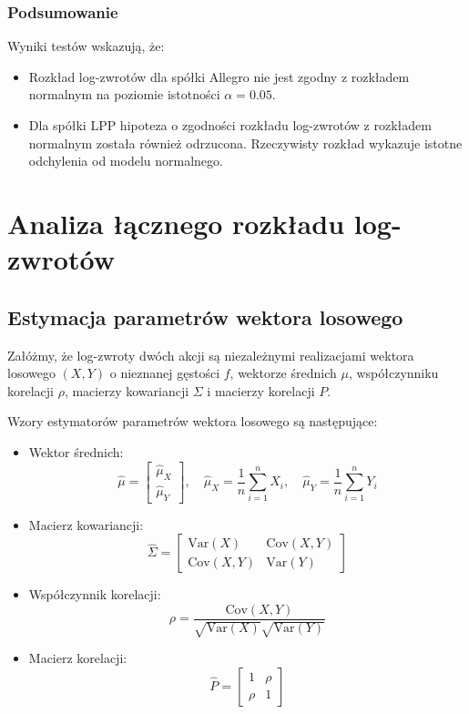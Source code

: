 \documentclass[12pt]{article}
\begin{document}
\subsubsection{Podsumowanie}

Wyniki testów wskazują, że:
\begin{itemize}
    \item Rozkład log-zwrotów dla spółki Allegro nie jest zgodny z rozkładem normalnym na poziomie istotności \( \alpha = 0.05 \).
    \item Dla spółki LPP hipoteza o zgodności rozkładu log-zwrotów z rozkładem normalnym została również odrzucona. Rzeczywisty rozkład wykazuje istotne odchylenia od modelu normalnego.
\end{itemize}


\section{Analiza łącznego rozkładu log-zwrotów}

\subsection{Estymacja parametrów wektora losowego}
Załóżmy, że log-zwroty dwóch akcji są niezależnymi realizacjami wektora losowego \( (X, Y) \) o nieznanej gęstości \( f \), wektorze średnich \( \mu \), współczynniku korelacji \( \rho \), macierzy kowariancji \( \Sigma \) i macierzy korelacji \( P \).

Wzory estymatorów parametrów wektora losowego są następujące:
\begin{itemize}
    \item Wektor średnich:
    \[
    \hat{\mu} = \begin{bmatrix} \hat{\mu}_X \\ \hat{\mu}_Y \end{bmatrix}, \quad
    \hat{\mu}_X = \frac{1}{n} \sum_{i=1}^n X_i, \quad
    \hat{\mu}_Y = \frac{1}{n} \sum_{i=1}^n Y_i
    \]
    \item Macierz kowariancji:
    \[
    \hat{\Sigma} = \begin{bmatrix} \mathrm{Var}(X) & \mathrm{Cov}(X, Y) \\ \mathrm{Cov}(X, Y) & \mathrm{Var}(Y) \end{bmatrix}
    \]
    \item Współczynnik korelacji:
    \[
    \rho = \frac{\mathrm{Cov}(X, Y)}{\sqrt{\mathrm{Var}(X)} \sqrt{\mathrm{Var}(Y)}}
    \]
    \item Macierz korelacji:
    \[
    \hat{P} = \begin{bmatrix} 1 & \rho \\ \rho & 1 \end{bmatrix}
    \]
\end{itemize}
\end{document}
